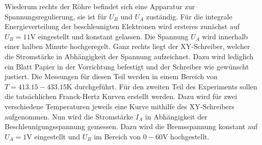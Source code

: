 Wiederum rechts der Röhre befindet sich eine Apparatur zur Spannungsregulierung,
sie ist für $U_B$ und $U_A$ zuständig.
\vspace{0.5em}
Für die integrale Energieverteilung der beschleunigten Elektronen wird ersteres 
zunächst auf $U_B = 11 \unit{\volt}$ eingestellt und konstant gelassen. Die
Spannung $U_A$ wird innerhalb einer halben Minute hochgeregelt. Ganz rechts 
liegt der XY-Schreiber, welcher die Stromstärke in Abhängigkeit der Spannung 
aufzeichnet. Dazu wird lediglich ein Blatt Papier in der Vorrichtung befestigt 
und der Schreiber wie gewünscht justiert. Die Messungen für diesen Teil werden 
in einem Bereich von $T = 413.15 - 433.15 \unit{\kelvin}$ durchgeführt.
\vspace{0.5em}
Für den zweiten Teil des Experiments sollen die tatsächlichen Franck-Hertz Kurven 
erstellt werden. Dazu wird für zwei verschiedene Temperaturen jeweils eine Kurve 
mithilfe des XY-Schreibers aufgenommen. Nun wird die Stromstärke $I_A$ in 
Abhängigkeit der Beschleunigungsspannung gemessen. Dazu wird die Bremsspannung 
konstant auf $U_A = 1 \unit{\volt}$ eingestellt und $U_B$ im Bereich von $0 -
60 \unit{\volt}$ hochgestellt.